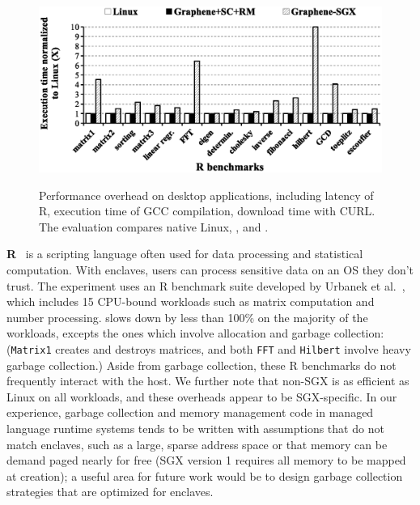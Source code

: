 \begin{figure}[t!]
\centering
\footnotesize
\includegraphics[width=40em]{r-overhead}\\
\caption{Performance overhead on desktop applications, including latency of R, execution time of GCC compilation, download time with CURL. The evaluation compares native Linux, \graphene{}, and \graphenesgx{}.} %
\label{fig:eval:r-overheads}
\end{figure}


{\bf R}~\cite{r-project} is a scripting language often used for
data processing and statistical computation.
With enclaves, users can process sensitive data on an
OS they don't trust.
The experiment uses an R benchmark suite developed by Urbanek et al.~\cite{r-benchmark-25}, which includes 15 CPU-bound workloads such as matrix computation and number processing.
\graphenesgx{} slows down by less than 100\% on the majority of the workloads, excepts the ones which involve allocation and garbage collection: ({\tt Matrix1} creates and destroys matrices, and both {\tt FFT} and {\tt Hilbert} involve heavy garbage collection.)
Aside from garbage collection, these R benchmarks do not frequently interact with the host.
We further note that non-SGX \graphene{} is as efficient as Linux on all workloads, 
and these overheads appear to be SGX-specific.
In our experience, garbage collection and memory management code in managed language runtime
systems tends to be written with assumptions that do not match enclaves,
such as a large, sparse address space or that memory can be demand paged 
nearly for free (SGX version 1 requires all memory to be mapped
at creation); a useful area for future work would be to design
garbage collection strategies that are optimized for enclaves.



